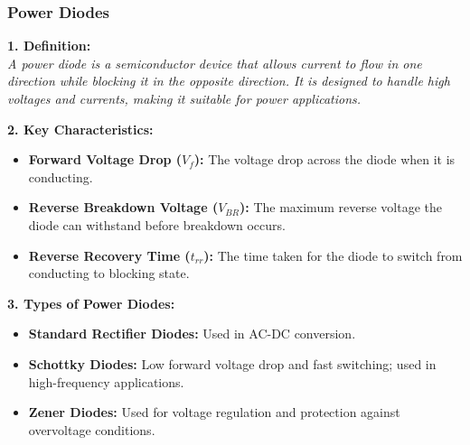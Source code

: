 \begin{frame}
    \frametitle{Power Diodes}
    \textbf{1. Definition:} \\
    \textit{A power diode is a semiconductor device that allows current to flow in one direction while blocking it in the opposite direction. It is designed to handle high voltages and currents, making it suitable for power applications.}

    \textbf{2. Key Characteristics:}
    \begin{itemize}
        \item \textbf{Forward Voltage Drop (\(V_f\)):} The voltage drop across the diode when it is conducting.
        \item \textbf{Reverse Breakdown Voltage (\(V_{BR}\)):} The maximum reverse voltage the diode can withstand before breakdown occurs.
        \item \textbf{Reverse Recovery Time (\(t_{rr}\)):} The time taken for the diode to switch from conducting to blocking state.
    \end{itemize}

    \textbf{3. Types of Power Diodes:}
    \begin{itemize}
        \item \textbf{Standard Rectifier Diodes:} Used in AC-DC conversion.
        \item \textbf{Schottky Diodes:} Low forward voltage drop and fast switching; used in high-frequency applications.
        \item \textbf{Zener Diodes:} Used for voltage regulation and protection against overvoltage conditions.
    \end{itemize}
\end{frame}

